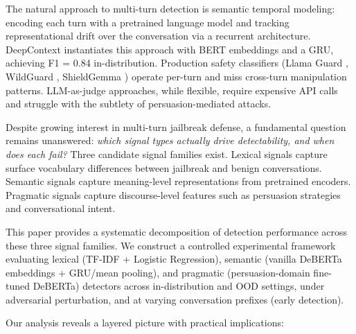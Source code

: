 \documentclass[11pt]{article}
\begin{document}
The natural approach to multi-turn detection is semantic temporal modeling: encoding each turn with a pretrained language model and tracking representational drift over the conversation via a recurrent architecture. DeepContext \citep{su2026deepcontext} instantiates this approach with BERT embeddings and a GRU, achieving F1 = 0.84 in-distribution. Production safety classifiers (Llama Guard \citep{inan2023llamaguard}, WildGuard \citep{han2024wildguard}, ShieldGemma \citep{zeng2024shieldgemma}) operate per-turn and miss cross-turn manipulation patterns. LLM-as-judge approaches, while flexible, require expensive API calls and struggle with the subtlety of persuasion-mediated attacks.

Despite growing interest in multi-turn jailbreak defense, a fundamental question remains unanswered: \textit{which signal types actually drive detectability, and when does each fail?} Three candidate signal families exist. Lexical signals capture surface vocabulary differences between jailbreak and benign conversations. Semantic signals capture meaning-level representations from pretrained encoders. Pragmatic signals capture discourse-level features such as persuasion strategies and conversational intent.

This paper provides a systematic decomposition of detection performance across these three signal families. We construct a controlled experimental framework evaluating lexical (TF-IDF + Logistic Regression), semantic (vanilla DeBERTa embeddings + GRU/mean pooling), and pragmatic (persuasion-domain fine-tuned DeBERTa) detectors across in-distribution and OOD settings, under adversarial perturbation, and at varying conversation prefixes (early detection).

Our analysis reveals a layered picture with practical implications:
\end{document}
